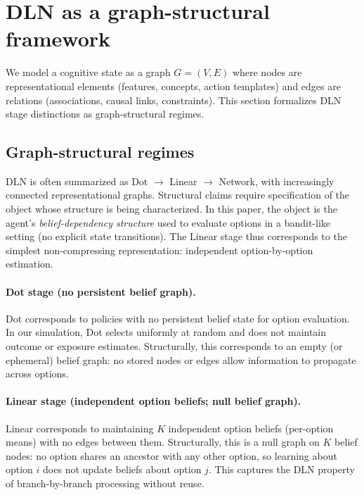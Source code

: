 \documentclass[11pt]{article}
\begin{document}
\section{DLN as a graph-structural framework}

We model a cognitive state as a graph $G=(V,E)$ where nodes are representational elements (features, concepts, action templates) and edges are relations (associations, causal links, constraints). This section formalizes DLN stage distinctions as graph-structural regimes.

\subsection{Graph-structural regimes}

DLN is often summarized as Dot $\rightarrow$ Linear $\rightarrow$ Network, with increasingly connected representational graphs. Structural claims require specification of the object whose structure is being characterized. In this paper, the object is the agent's \emph{belief-dependency structure} used to evaluate options in a bandit-like setting (no explicit state transitions). The Linear stage thus corresponds to the simplest non-compressing representation: independent option-by-option estimation.

\paragraph{Dot stage (no persistent belief graph).}
Dot corresponds to policies with no persistent belief state for option evaluation. In our simulation, Dot selects uniformly at random and does not maintain outcome or exposure estimates.
Structurally, this corresponds to an empty (or ephemeral) belief graph: no stored nodes or edges allow information to propagate across options.

\paragraph{Linear stage (independent option beliefs; null belief graph).}
Linear corresponds to maintaining $K$ independent option beliefs (per-option means) with no edges between them.
Structurally, this is a null graph on $K$ belief nodes: no option shares an ancestor with any other option, so learning about option $i$ does not update beliefs about option $j$.
This captures the DLN property of branch-by-branch processing without reuse.
\end{document}
